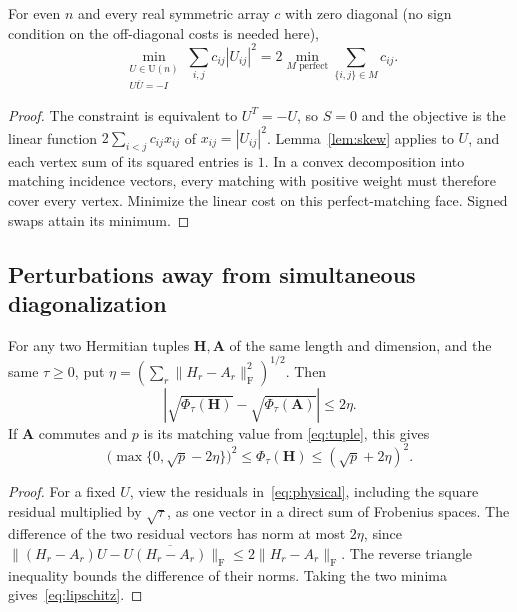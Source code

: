 \documentclass[11pt]{article}
\newcommand{\U}{\mathrm U}
\newcommand{\F}{\mathrm F}
\begin{document}
\begin{corollary}\label{cor:hard}
For even $n$ and every real symmetric array $c$ with zero diagonal
(no sign condition on the off-diagonal costs is needed here),
\begin{equation}\label{eq:perfect}
 \min_{\substack{U\in\U(n)\\U\overline U=-I}}
      \sum_{i,j}c_{ij}|U_{ij}|^2
 =2\min_{M\text{ perfect}}\sum_{\{i,j\}\in M}c_{ij}.
\end{equation}
\end{corollary}
\begin{proof}
The constraint is equivalent to $U^T=-U$, so $S=0$ and the objective
is the linear function $2\sum_{i<j}c_{ij}x_{ij}$ of
$x_{ij}=|U_{ij}|^2$. Lemma~\ref{lem:skew} applies to $U$, and each
vertex sum of its squared entries is $1$. In a convex decomposition
into matching incidence vectors, every matching with positive weight
must therefore cover every vertex. Minimize the linear cost on this
perfect-matching face. Signed swaps attain its minimum.
\end{proof}

\subsection{Perturbations away from simultaneous diagonalization}

\begin{proposition}\label{prop:perturbation}
For any two Hermitian tuples $\mathbf H,\mathbf A$ of the same length
and dimension, and the same $\tau\geq0$, put
$\eta=(\sum_r\|H_r-A_r\|_\F^2)^{1/2}$. Then
\begin{equation}\label{eq:lipschitz}
 |\sqrt{\Phi_\tau(\mathbf H)}-\sqrt{\Phi_\tau(\mathbf A)}|
 \leq2\eta.
\end{equation}
If $\mathbf A$ commutes and $p$ is its matching value from
\eqref{eq:tuple}, this gives
\[
 \bigl(\max\{0,\sqrt p-2\eta\}\bigr)^2
 \leq\Phi_\tau(\mathbf H)\leq(\sqrt p+2\eta)^2.
\]
\end{proposition}
\begin{proof}
For a fixed $U$, view the residuals in~\eqref{eq:physical}, including
the square residual multiplied by $\sqrt\tau$, as one vector in a
direct sum of Frobenius spaces. The difference of the two residual
vectors has norm at most $2\eta$, since
$\|(H_r-A_r)U-U\overline{(H_r-A_r)}\|_\F\leq2\|H_r-A_r\|_\F$.
The reverse triangle inequality bounds the difference of their norms.
Taking the two minima gives~\eqref{eq:lipschitz}.
\end{proof}
\end{document}
